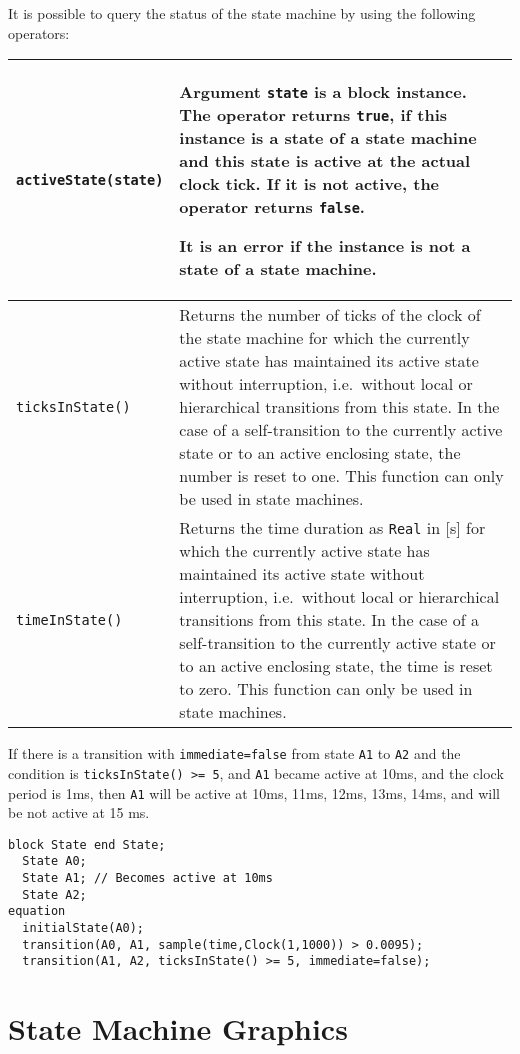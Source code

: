 It is possible to query the status of the state machine by using the
following operators:
\begin{longtable}[]{|p{4cm}|p{10cm}|}
\hline \endhead
\lstinline!activeState(state)!&
Argument \lstinline!state! is a block instance. The operator returns
\lstinline!true!, if this instance is a state of a state machine and this
state is active at the actual clock tick. If it is not active, the
operator returns \lstinline!false!.

It is an error if the instance is not a state of a state machine.\\ \hline
\lstinline!ticksInState()! & Returns the number of ticks of the clock of the state machine
for which the currently active state has maintained its active state without interruption,
i.e.\ without local or hierarchical transitions from this state.
In the case of a self-transition to the currently active state or to an active enclosing state,
the number is reset to one.
This function can only be used in state machines.\\ \hline
\lstinline!timeInState()! & Returns the time duration as \lstinline!Real! in {[}s{]}
for which the currently active state has maintained its active state without interruption,
i.e.\ without local or hierarchical transitions from this state.
In the case of a self-transition to the currently active state or to an active enclosing state,
the time is reset to zero.
This function can only be used in state machines.\\ \hline
\end{longtable}

\begin{example}
If there is a transition with \lstinline!immediate=false! from
state \lstinline!A1! to \lstinline!A2! and the condition is \lstinline!ticksInState() >= 5!, and \lstinline!A1! became
active at 10ms, and the clock period is 1ms, then \lstinline!A1! will be active at
10ms, 11ms, 12ms, 13ms, 14ms, and will be not active at 15 ms.
\begin{lstlisting}[language=modelica]
  block State end State;
  State A0;
  State A1; // Becomes active at 10ms
  State A2;
equation
  initialState(A0);
  transition(A0, A1, sample(time,Clock(1,1000)) > 0.0095);
  transition(A1, A2, ticksInState() >= 5, immediate=false);
\end{lstlisting}
\end{example}

\section{State Machine Graphics}\label{state-machine-graphics}


